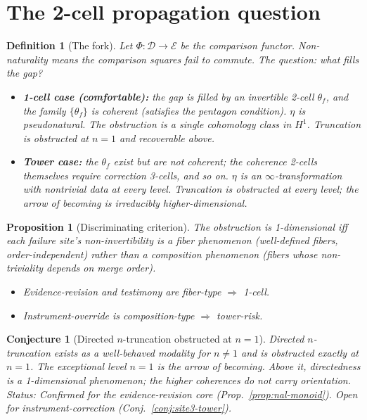 \documentclass[11pt]{article}
\newtheorem{definition}{Definition}
\newtheorem{conjecture}{Conjecture}
\newtheorem{proposition}{Proposition}
\newcommand{\Dc}{\mathcal{D}}
\newcommand{\Ec}{\mathcal{E}}
\begin{document}
\section{The 2-cell propagation question}

\begin{definition}[The fork]
\label{def:2-cell-fork}
Let $\Phi : \Dc \to \Ec$ be the comparison functor. Non-naturality means the comparison squares
fail to commute. The question: what fills the gap?
\begin{itemize}
  \item \textbf{1-cell case (comfortable):} the gap is filled by an invertible 2-cell
        $\theta_f$, and the family $\{\theta_f\}$ is coherent (satisfies the pentagon
        condition). $\eta$ is pseudonatural. The obstruction is a single cohomology class in
        $H^1$. Truncation is obstructed at $n = 1$ and recoverable above.
  \item \textbf{Tower case:} the $\theta_f$ exist but are not coherent; the coherence
        2-cells themselves require correction 3-cells, and so on. $\eta$ is an
        $\infty$-transformation with nontrivial data at every level. Truncation is obstructed
        at every level; the arrow of becoming is irreducibly higher-dimensional.
\end{itemize}
\end{definition}

\begin{proposition}[Discriminating criterion]
\label{prop:discriminate}
The obstruction is 1-dimensional iff each failure site's non-invertibility is a \emph{fiber
phenomenon} (well-defined fibers, order-independent) rather than a \emph{composition phenomenon}
(fibers whose non-triviality depends on merge order).
\begin{itemize}
  \item Evidence-revision and testimony are fiber-type $\Rightarrow$ 1-cell.
  \item Instrument-override is composition-type $\Rightarrow$ tower-risk.
\end{itemize}
\end{proposition}

\begin{conjecture}[Directed $n$-truncation obstructed at $n = 1$]
\label{conj:truncation-obstructed}
Directed $n$-truncation exists as a well-behaved modality for $n \neq 1$ and is obstructed
exactly at $n = 1$. The exceptional level $n = 1$ is the arrow of becoming. Above it,
directedness is a 1-dimensional phenomenon; the higher coherences do not carry orientation.
\\[4pt]
\emph{Status:} Confirmed for the evidence-revision core (Prop.~\ref{prop:nal-monoid}).
Open for instrument-correction (Conj.~\ref{conj:site3-tower}).
\end{conjecture}
\end{document}
